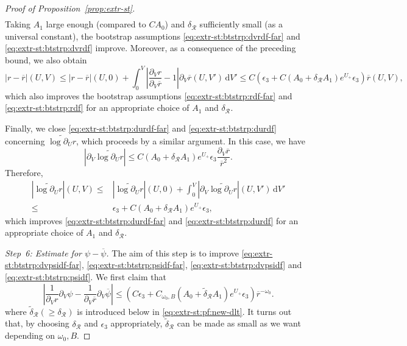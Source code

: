 \documentclass[10pt, reqno]{amsart}
\theoremstyle{definition}
\theoremstyle{remark}
\theoremstyle{conjecture}
\numberwithin{equation}{section}
\newcommand{\abs}[1]{\vert#1\vert}
\newcommand{\ud}{\mathrm{d}}
\newcommand{\rd}{\partial}
\newcommand{\0}{\emptyset}
\newcommand{\dlt}{\delta}
\newcommand{\eps}{\epsilon}
\newcommand{\omg}{\omega}
\newcommand{\calR}{\mathcal R}
\newcommand{\pfstep}[1]{\vspace{.5em} {\it \noindent #1.}}
\newcommand{\psibg}{\overline{\psi}}				%
\newcommand{\rbg}{\overline{r}}					%
\newcommand{\Abs}[1]{\left\vert #1 \right\vert}
\begin{document}
\begin{proof}[Proof of Proposition~\ref{prop:extr-st}]
\begin{align*}
\end{align*}
Taking $A_{1}$ large enough (compared to $C A_{0}$) and $\dlt_{\calR}$ sufficiently small (as a universal constant), the bootstrap assumptions \eqref{eq:extr-st:btstrp:dvrdf-far} and \eqref{eq:extr-st:btstrp:dvrdf}  improve. Moreover, as a consequence of the preceding bound, we also obtain
\begin{equation*}
	\abs{r - \rbg}(U, V) 
	\leq \abs{r - \rbg}(U, 0) + \int_{0}^{V} \Abs{\frac{\rd_{V} r}{\rd_{V} \rbg} - 1} \rd_{V} \rbg (U, V') \, \ud V' 
	\leq C \left( \eps_{3} + C (A_{0} + \dlt_{\calR} A_{1}) e^{U_{+}} \eps_{3} \right) \rbg(U, V),
\end{equation*}
which also improves the bootstrap assumptions \eqref{eq:extr-st:btstrp:rdf-far} and \eqref{eq:extr-st:btstrp:rdf} for an appropriate choice of $A_{1}$ and $\dlt_{\calR}$. 

Finally, we close \eqref{eq:extr-st:btstrp:durdf-far} and \eqref{eq:extr-st:btstrp:durdf} concerning $\widetilde{\log \rd_{U} r}$, which proceeds by a similar argument. In this case, we have
\begin{equation} \label{eq:extr-st:pf:dvlogdurdf}
	\Abs{\rd_{V} \widetilde{\log \rd_{U} r}}
	\leq C (A_{0} + \dlt_{\calR} A_{1}) e^{U_{+}} \eps_{3}  \frac{\rd_{V} \rbg}{\rbg^{2}}.
\end{equation}
Therefore,
\begin{align*}
	\Abs{\widetilde{\log \rd_{U} r}} (U, V) 
	\leq & \Abs{\widetilde{\log \rd_{U} r}} (U, 0) + \int_{0}^{V} \Abs{\rd_{V} \widetilde{\log \rd_{U} r}} (U, V') \, \ud V' \\
	\leq & \eps_{3} + C (A_{0} + \dlt_{\calR} A_{1}) e^{U_{+}} \eps_{3},
\end{align*}
which improves \eqref{eq:extr-st:btstrp:durdf-far} and \eqref{eq:extr-st:btstrp:durdf} for an appropriate choice of $A_{1}$ and $\dlt_{\calR}$.

\pfstep{Step~6: Estimate for $\psi - \psibg$}
The aim of this step is to improve \eqref{eq:extr-st:btstrp:dvpsidf-far}, \eqref{eq:extr-st:btstrp:psidf-far}, \eqref{eq:extr-st:btstrp:dvpsidf} and \eqref{eq:extr-st:btstrp:psidf}. We first claim that
\begin{equation} \label{eq:extr-st:pf:dvpsidf}
	\Abs{\frac{1}{\rd_{V} r} \rd_{V} \psi - \frac{1}{\rd_{V} \rbg} \rd_{V} \psibg} \leq \left( C \eps_{3} + C_{\omg_0, B} (A_{0} + \widetilde{\dlt}_{\calR} A_{1}) e^{U_{+}} \eps_{3} \right) \rbg^{-\omg_0}.
\end{equation}
where $\widetilde{\dlt}_{\calR} (\geq \dlt_{\calR})$ is introduced below in \eqref{eq:extr-st:pf:new-dlt}. It turns out that, by choosing $\dlt_{\calR}$ and $\eps_{3}$ appropriately, $\widetilde{\dlt}_{\calR}$ can be made as small as we want depending on $\omg_0, B$. 


\end{proof}
\end{document}
